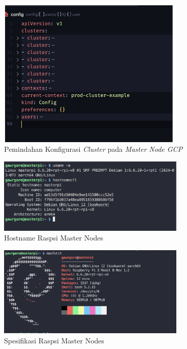 \begin{figure}[ht]
  \centering
  \includegraphics[width=0.8\textwidth]{resources/chapter-4/pengujian/kube-gcp-08.jpg}
  \caption{Pemindahan Konfigurasi \textit{Cluster} pada \textit{Master Node GCP}}
  \label{fig:proses-pemindahan-konfigurasi-master-gcp}
\end{figure}

\begin{figure}[ht]
  \centering
  \includegraphics[width=0.8\textwidth]{resources/chapter-4/pengujian/raspi-01.jpg}
  \caption{Hostname Raspsi Master Nodes}
  \label{fig:hostname-raspi-master-nodes}
\end{figure}

\begin{figure}[ht]
  \centering
  \includegraphics[width=0.8\textwidth]{resources/chapter-4/pengujian/raspi-master-neofetch.jpg}
  \caption{Spesifikasi Raspsi Master Nodes}
  \label{fig:spesifikasi-raspi-master-nodes}
\end{figure}

